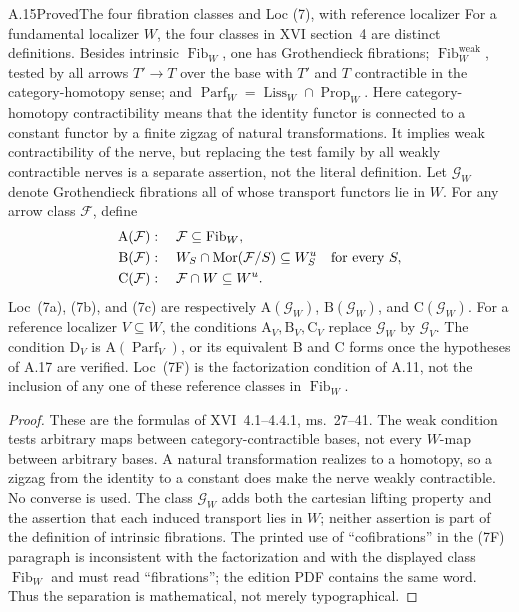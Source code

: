 \begin{claim}{A.15}{Proved}{The four fibration classes and Loc (7), with reference localizer}
For a fundamental localizer $W$, the four classes in XVI section~4 are distinct definitions. Besides intrinsic $\operatorname{Fib}_W$, one has Grothendieck fibrations; $\operatorname{Fib}^{\mathrm{weak}}_W$, tested by all arrows $T'\to T$ over the base with $T'$ and $T$ contractible in the category-homotopy sense; and $\operatorname{Parf}_W=\operatorname{Liss}_W\cap\operatorname{Prop}_W$. Here category-homotopy contractibility means that the identity functor is connected to a constant functor by a finite zigzag of natural transformations. It implies weak contractibility of the nerve, but replacing the test family by all weakly contractible nerves is a separate assertion, not the literal definition. Let $\mathcal G_W$ denote Grothendieck fibrations all of whose transport functors lie in $W$. For any arrow class $\mathcal F$, define
\[
\begin{aligned}
\mathrm A(\mathcal F)&:\quad\mathcal F\subseteq\operatorname{Fib}_W,\\
\mathrm B(\mathcal F)&:\quad W_S\cap\operatorname{Mor}(\mathcal F/S)
 \subseteq W_S^u\quad\hbox{for every }S,\\
\mathrm C(\mathcal F)&:\quad\mathcal F\cap W\subseteq W^u.
\end{aligned}
\]
Loc~(7a), (7b), and (7c) are respectively $\mathrm A(\mathcal G_W)$, $\mathrm B(\mathcal G_W)$, and $\mathrm C(\mathcal G_W)$. For a reference localizer $V\subseteq W$, the conditions $\mathrm A_V,\mathrm B_V,\mathrm C_V$ replace $\mathcal G_W$ by $\mathcal G_V$. The condition $\mathrm D_V$ is $\mathrm A(\operatorname{Parf}_V)$, or its equivalent B and C forms once the hypotheses of A.17 are verified. Loc~(7F) is the factorization condition of A.11, not the inclusion of any one of these reference classes in $\operatorname{Fib}_W$.
\end{claim}
\begin{proof}
These are the formulas of XVI~4.1--4.4.1, ms.~27--41. The weak condition tests arbitrary maps between category-contractible bases, not every $W$-map between arbitrary bases. A natural transformation realizes to a homotopy, so a zigzag from the identity to a constant does make the nerve weakly contractible. No converse is used. The class $\mathcal G_W$ adds both the cartesian lifting property and the assertion that each induced transport lies in $W$; neither assertion is part of the definition of intrinsic fibrations. The printed use of ``cofibrations'' in the (7F) paragraph is inconsistent with the factorization and with the displayed class $\operatorname{Fib}_W$ and must read ``fibrations''; the edition PDF contains the same word. Thus the separation is mathematical, not merely typographical.
\end{proof}

